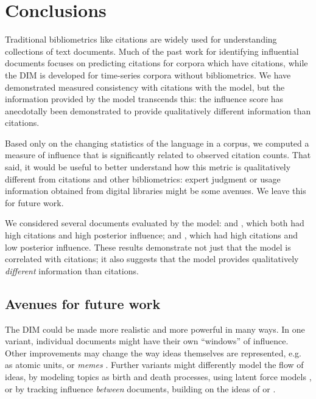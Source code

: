

\section{Conclusions}

Traditional bibliometrics like citations are widely used for
understanding collections of text documents.  Much of the past work
for identifying influential documents focuses on predicting citations
for corpora which have citations, while the DIM is developed for
time-series corpora without bibliometrics.  We have demonstrated
measured consistency with citations with the model, but the
information provided by the model transcends this: the influence score
has anecdotally been demonstrated to provide qualitatively different
information than citations.

Based only on the changing statistics of the language in a corpus, we
computed a measure of influence that is significantly related to
observed citation counts. That said, it would be useful to better
understand how this metric is qualitatively different from citations
and other bibliometrics: expert judgment or usage information obtained
from digital libraries might be some avenues.  We leave this for
future work.

We considered several documents evaluated by the model:
\cite{brown:1993} and \cite{toole:1984}, which both had high citations
and high posterior influence; and \cite{marcus:1993}, which had high
citations and low posterior influence.
These results demonstrate not just that the model is correlated with
citations; it also suggests that the model provides qualitatively
\emph{different} information than citations.

\subsection{Avenues for future work}
The DIM could be made more realistic and more powerful in many ways.
In one variant, individual documents might have their own ``windows''
of influence.  Other improvements may change the way ideas themselves
are represented, e.g. as atomic units, or \emph{memes}
\citep{leskovec:2009}.  Further variants might differently model the
flow of ideas, by modeling topics as birth and death processes, using
latent force models \citep{alvarez:2009}, or by tracking influence
\emph{between} documents, building on the ideas of
\cite{shaparenko:2007} or \cite{dietz:2007}. %

